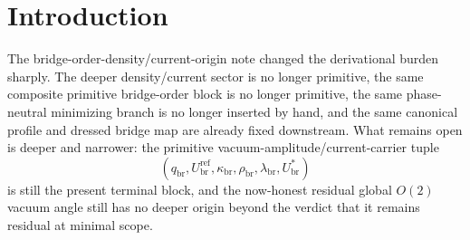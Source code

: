 \documentclass[11pt]{article}
\newcommand{\CurvProfileCan}{F_{\mathrm{br}}^{\mathrm{can}}}
\newcommand{\RespSusEq}{\Sigma_{\mathrm{br}}^{\ast}}
\newcommand{\RespOrderRef}{Z_{\mathrm{br}}^{\mathrm{ref}}}
\newcommand{\RespOrderEq}{Z_{\mathrm{br}}^{\ast}}
\newcommand{\RespOrderReadout}{\Xi_{\mathrm{br}}}
\newcommand{\RespOrderStiff}{\Gamma_{\mathrm{br}}^{\mathrm{ord}}}
\newcommand{\RespOrderQuartic}{\Lambda_{\mathrm{br}}}
\newcommand{\RespDeepDensityRef}{\mathcal Z_{\mathrm{br}}^{\mathrm{ref}}}
\newcommand{\RespDeepDensityEq}{\mathcal Z_{\mathrm{br}}^{\ast}}
\newcommand{\RespDeepReadout}{\mathfrak X_{\mathrm{br}}}
\newcommand{\RespDeepTrack}{\mathfrak a_{\mathrm{br}}}
\newcommand{\RespDeepRelax}{\mathfrak b_{\mathrm{br}}}
\newcommand{\RespDeepWell}{\mathfrak l_{\mathrm{br}}}
\newcommand{\RespVacAmp}{U_{\mathrm{br}}}
\newcommand{\RespVacRef}{U_{\mathrm{br}}^{\mathrm{ref}}}
\newcommand{\RespVacEq}{U_{\mathrm{br}}^{\ast}}
\newcommand{\RespVacPhase}{\phi_{\mathrm{br}}}
\newcommand{\RespVacCarrier}{V_{\mathrm{br}}}
\newcommand{\RespVacReadout}{q_{\mathrm{br}}}
\newcommand{\RespVacCov}{\kappa_{\mathrm{br}}}
\newcommand{\RespVacRelax}{\rho_{\mathrm{br}}}
\newcommand{\RespVacWell}{\lambda_{\mathrm{br}}}
\newcommand{\RespScaleField}{S_{\mathrm{br}}}
\newcommand{\RespScaleEq}{S_{\mathrm{br}}^{\ast}}
\newcommand{\RespScaleAmpRef}{A_{\mathrm{br}}^{\mathrm{ref}}}
\newcommand{\RespScaleAmpEq}{A_{\mathrm{br}}^{\ast}}
\newcommand{\RespScaleReadout}{\bar q_{\mathrm{br}}}
\newcommand{\RespScaleCov}{\bar\kappa_{\mathrm{br}}}
\newcommand{\RespScaleRelax}{\bar\rho_{\mathrm{br}}}
\newcommand{\RespScaleWell}{\bar\lambda_{\mathrm{br}}}
\newcommand{\RespScaleIso}{\bar\eta_{\mathrm{br}}}
\begin{document}
\begin{abstract}
The minimizing branch of the deeper calibration lift is exactly
\[
\RespScaleField(x)\equiv \RespScaleEq,
\qquad
\RespVacAmp(x)\equiv \RespScaleEq\,\RespScaleAmpEq,
\qquad
\RespVacCarrier(x)\equiv0,
\qquad
\RespVacPhase(x)\equiv \phi_0
\]
for arbitrary constant \(\phi_0\in\mathbb R/2\pi\mathbb Z\). Therefore the same phase-neutral zero-current minimizing branch is preserved, but the global \(O(2)\) vacuum angle remains genuinely residual: the deeper scalar calibration sector adds neither anisotropic locking nor a true gauge quotient. The same recovered density/current block,
\[
(\RespDeepReadout,\RespDeepDensityRef,\RespDeepTrack,\RespDeepRelax,\RespDeepWell,\RespDeepDensityEq)
=
(\RespScaleReadout\RespScaleEq,(\RespScaleEq\RespScaleAmpRef)^2,\RespScaleCov(\RespScaleEq)^2,\RespScaleRelax(\RespScaleEq)^2,\RespScaleWell,(\RespScaleEq\RespScaleAmpEq)^2),
\]
the same composite primitive bridge-order block,
\[
(\RespOrderReadout,\RespOrderRef,\RespOrderStiff,\RespOrderQuartic,\RespOrderEq)
=
(\RespScaleReadout\RespScaleEq,\RespScaleEq\RespScaleAmpRef,(\RespScaleEq)^2\RespScaleIso,\RespScaleWell,\RespScaleEq\RespScaleAmpEq),
\]
the same equilibrium susceptibility,
\[
\RespSusEq=\frac{\RespVacEq}{\RespVacRef}=\frac{\RespScaleAmpEq}{\RespScaleAmpRef},
\]
the same canonical profile
\[
\CurvProfileCan(x)=1+\RespSusEq x^2,
\]
and the same downstream package and surviving dressed bridge map are therefore preserved. The claim boundary is strict: the note does not claim a unique ultraviolet completion of the bridge-curvature response line. Its narrower positive result is that the primitive vacuum-amplitude/current-carrier data are now derived or sharply constrained by a still more primitive calibration-modulus structure, while the residual global \(O(2)\) vacuum angle is left honestly residual unless a deeper future sector naturally supplies either locking or an actual gauge quotient.
\end{abstract}

\section{Introduction}

The bridge-order-density/current-origin note changed the derivational burden sharply. The deeper density/current sector is no longer primitive, the same composite primitive bridge-order block is no longer primitive, the same phase-neutral minimizing branch is no longer inserted by hand, and the same canonical profile and dressed bridge map are already fixed downstream. What remains open is deeper and narrower: the primitive vacuum-amplitude/current-carrier tuple
\[
(\RespVacReadout,\RespVacRef,\RespVacCov,\RespVacRelax,\RespVacWell,\RespVacEq)
\]
is still the present terminal block, and the now-honest residual global \(O(2)\) vacuum angle still has no deeper origin beyond the verdict that it remains residual at minimal scope.
\end{document}
